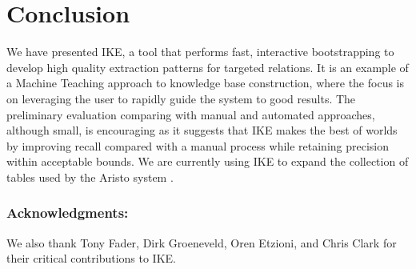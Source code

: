 \documentclass[11pt,letterpaper]{article}
\begin{document}

\section{Conclusion}

We have presented IKE, a tool that performs fast, interactive bootstrapping to develop high quality extraction patterns for targeted relations. It is an example of a Machine Teaching approach to knowledge base construction, where the focus is on leveraging the user to rapidly guide the system to good results. The preliminary evaluation comparing with manual and automated approaches, although small, is encouraging as it suggests that IKE makes the best of worlds by improving recall compared with a manual process while retaining precision within acceptable bounds. We are currently using IKE to expand the collection of tables used by the Aristo system \cite{clark:2016}.


\subsubsection*{Acknowledgments:} 
We also thank Tony Fader, Dirk Groeneveld, Oren Etzioni, and Chris Clark for their critical contributions to IKE.



\end{document}

